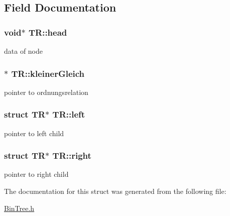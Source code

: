 \subsection{Field Documentation}
\hypertarget{structTR_a4a6e0ce8984eafdf3f9a0f2dc37188ea}{
\subsubsection[{head}]{\setlength{\rightskip}{0pt plus 5cm}void$\ast$ T\-R\-::head}}\label{structTR_a4a6e0ce8984eafdf3f9a0f2dc37188ea}
data of node \hypertarget{structTR_acc3b4851c26d2ad30a2226cc16ff54c4}{
\subsubsection[{kleiner\-Gleich}]{$\ast$ T\-R\-::kleiner\-Gleich}}\label{structTR_acc3b4851c26d2ad30a2226cc16ff54c4}
pointer to ordnungsrelation \hypertarget{structTR_a2a6824313e4bd8f243ea5c989d245c6a}{
\subsubsection[{left}]{\setlength{\rightskip}{0pt plus 5cm}struct {\bf T\-R}$\ast$ T\-R\-::left}}\label{structTR_a2a6824313e4bd8f243ea5c989d245c6a}
pointer to left child \hypertarget{structTR_a66e2c91878541eef40a1ffde509a4d5e}{
\subsubsection[{right}]{\setlength{\rightskip}{0pt plus 5cm}struct {\bf T\-R}$\ast$ T\-R\-::right}}\label{structTR_a66e2c91878541eef40a1ffde509a4d5e}
pointer to right child 

The documentation for this struct was generated from the following file\-:\begin{DoxyCompactItemize}
\item 
\hyperlink{BinTree_8h}{Bin\-Tree.\-h}\end{DoxyCompactItemize}
